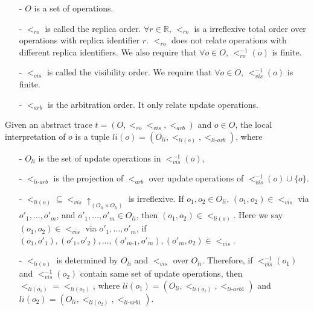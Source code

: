 \begin{itemize}
\setlength{\itemsep}{0.5pt}
\item[-] $O$ is a set of operations. 

\item[-] $<_{\textit{ro}}$ is called the replica order. $\forall r \in \mathbb{R}$, $<_{\textit{ro}}$ is a irreflexive total order over operations with replica identifier $r$. $<_{\textit{ro}}$ does not relate operations with different replica identifiers. We also require that $\forall o \in O$, $<_{\textit{ro}}^{-1}(o)$ is finite.

\item[-] $<_{\textit{vis}}$ is called the visibility order. We require that $\forall o \in O$, $<_{\textit{vis}}^{-1}(o)$ is finite. 

\item[-] $<_{\textit{arb}}$ is the arbitration order. {\color {red}It only relate update operations.}    
\end{itemize} 

Given an abstract trace $t = (O,<_{\textit{ro}}<_{\textit{vis}},<_{\textit{arb}})$ and $o \in O$, {\color {red}the local interpretation of $o$ is a tuple $li(o) = ( O_{li} ,<_{li(o)}, <_{\textit{li-arb}} )$}, where

\begin{itemize}
\setlength{\itemsep}{0.5pt}
\item[-] {\color {red}$O_{li}$ is the set of update operations in $<_{\textit{vis}}^{-1}(o)$,} 

\item[-] {\color {red}$<_{\textit{li-arb}}$ is the projection of $<_{\textit{arb}}$ over update operations of $<_{\textit{vis}}^{-1}(o) \cup \{ o \}$. } 

\item[-] $<_{li(o)} \subseteq <_{\textit{vis}} \uparrow_{(O_{li} \times O_{li})}$ is irreflexive. {\color {red}If $o_1,o_2 \in O_{li}$, $(o_1,o_2) \in <_{\textit{vis}}$ via $o'_1,\ldots,o'_m$, and $o'_1,\ldots,o'_m \in O_{li}$, then $(o_1,o_2) \in <_{li(o)}$.} Here we say $(o_1,o_2) \in <_{\textit{vis}}$ via $o'_1,\ldots,o'_m$, if $(o_1,o'_1),(o'_1,o'_2),\ldots,(o'_{\textit{m-1}},o'_m),(o'_m,o_2) \in <_{\textit{vis}}$.

\item[-] {\color {red} $<_{li(o)}$ is determined by $O_{li}$ and $<_{\textit{vis}}$ over $O_{li}$. Therefore, if $<_{\textit{vis}}^{-1}(o_1)$ and $<_{\textit{vis}}^{-1}(o_2)$ contain same set of update operations, then $<_{li(o_1)} = <_{li(o_2)}$,} where $li(o_1) = ( O_{li} ,<_{li(o_1)}, <_{\textit{li-arb1}} )$ and $li(o_2) = ( O_{li} ,<_{li(o_2)}, <_{\textit{li-arb1}} )$.
\end{itemize} 


